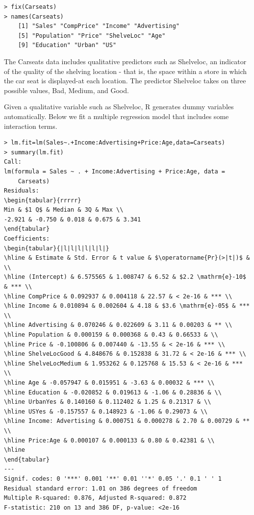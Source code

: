 \documentclass[10pt]{article}
\begin{document}
\begin{verbatim}
> fix(Carseats)
> names(Carseats)
    [1] "Sales" "CompPrice" "Income" "Advertising"
    [5] "Population" "Price" "ShelveLoc" "Age"
    [9] "Education" "Urban" "US"
\end{verbatim}

The Carseats data includes qualitative predictors such as Shelveloc, an indicator of the quality of the shelving location - that is, the space within a store in which the car seat is displayed-at each location. The predictor Shelveloc takes on three possible values, Bad, Medium, and Good.

Given a qualitative variable such as Shelveloc, R generates dummy variables automatically. Below we fit a multiple regression model that includes some interaction terms.

\begin{verbatim}
> lm.fit=lm(Sales~.+Income:Advertising+Price:Age,data=Carseats)
> summary(lm.fit)
Call:
lm(formula = Sales ~ . + Income:Advertising + Price:Age, data =
    Carseats)
Residuals:
\begin{tabular}{rrrrr} 
Min & $1 Q$ & Median & 3Q & Max \\
-2.921 & -0.750 & 0.018 & 0.675 & 3.341
\end{tabular}
Coefficients:
\begin{tabular}{|l|l|l|l|l|l|}
\hline & Estimate & Std. Error & t value & $\operatorname{Pr}(>|t|)$ & \\
\hline (Intercept) & 6.575565 & 1.008747 & 6.52 & $2.2 \mathrm{e}-10$ & *** \\
\hline CompPrice & 0.092937 & 0.004118 & 22.57 & < 2e-16 & *** \\
\hline Income & 0.010894 & 0.002604 & 4.18 & $3.6 \mathrm{e}-05$ & *** \\
\hline Advertising & 0.070246 & 0.022609 & 3.11 & 0.00203 & ** \\
\hline Population & 0.000159 & 0.000368 & 0.43 & 0.66533 & \\
\hline Price & -0.100806 & 0.007440 & -13.55 & < 2e-16 & *** \\
\hline ShelveLocGood & 4.848676 & 0.152838 & 31.72 & < 2e-16 & *** \\
\hline ShelveLocMedium & 1.953262 & 0.125768 & 15.53 & < 2e-16 & *** \\
\hline Age & -0.057947 & 0.015951 & -3.63 & 0.00032 & *** \\
\hline Education & -0.020852 & 0.019613 & -1.06 & 0.28836 & \\
\hline UrbanYes & 0.140160 & 0.112402 & 1.25 & 0.21317 & \\
\hline USYes & -0.157557 & 0.148923 & -1.06 & 0.29073 & \\
\hline Income: Advertising & 0.000751 & 0.000278 & 2.70 & 0.00729 & ** \\
\hline Price:Age & 0.000107 & 0.000133 & 0.80 & 0.42381 & \\
\hline
\end{tabular}
---
Signif. codes: 0 '***' 0.001 '**' 0.01 ''*' 0.05 '.' 0.1 ' ' 1
Residual standard error: 1.01 on 386 degrees of freedom
Multiple R-squared: 0.876, Adjusted R-squared: 0.872
F-statistic: 210 on 13 and 386 DF, p-value: <2e-16
\end{verbatim}
\end{document}
